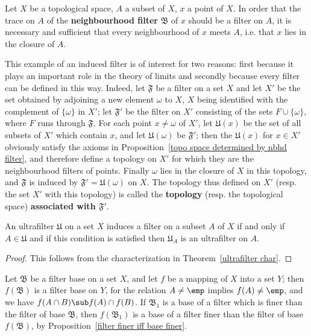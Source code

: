 \begin{example}
Let $X$ be a topological space, $A$ a subset of $X$, $x$ a point of $X$. In order that the trace on $A$ of the \textbf{neighbourhood filter} $\mathfrak{B}$ of $x$ should be a filter on $A$, it is necessary and sufficient that every neighbourhood of $x$ meets $A$, i.e. that $x$ lies in the closure of $A$.\par
This example of an induced filter is of interest for two reasons: first because it plays an important role in the theory of limits and secondly because every filter can be defined in this way. Indeed, let $\mathfrak{F}$ be a filter on a set $X$ and let $X'$ be the set obtained by adjoining a new element $\omega$ to $X$, $X$ being identified with the complement of $\{\omega\}$ in $X'$; let $\mathfrak{F}'$ be the filter on $X'$ consisting of the sets $F\cup\{\omega\}$, where $F$ runs through $\mathfrak{F}$. For each point $x\neq\omega$ of $X'$, let $\mathfrak{U}(x)$ be the set of all subsets of $X'$ which contain $x$, and let $\mathfrak{U}(\omega)$ be $\mathfrak{F}'$; then the $\mathfrak{U}(x)$ for $x\in X'$ obviously satisfy the axioms in Proposition~\ref{topo space determined by nbhd filter}, and therefore define a topology on $X'$ for which they are the neighbourhood filters of points. Finally $\omega$ lies in the closure of $X$ in this topology, and $\mathfrak{F}$ is induced by $\mathfrak{F}'=\mathfrak{U}(\omega)$ on $X$. The topology thus defined on $X'$ (resp. the set $X'$ with this topology) is called the \textbf{topology} (resp. the topological space) \textbf{associated with $\mathfrak{F}'$}.
\end{example}
\begin{proposition}
An ultrafilter $\mathfrak{U}$ on a set $X$ induces a filter on a subset $A$ of $X$ if and only if $A\in\mathfrak{U}$ and if this condition is satisfied then $\mathfrak{U}_A$ is an ultrafilter on $A$.
\end{proposition}
\begin{proof}
This follows from the characterization in Theorem~\ref{ultrafilter char}.
\end{proof}
Let $\mathfrak{B}$ be a filter base on a set $X$, and let $f$ be a mapping of $X$ into a set $Y$; then $f(\mathfrak{B})$ is a filter base on $Y$, for the relation $A\neq\emp$ implies $f(A)\neq\emp$, and we have $f(A\cap B)\sub f(A)\cap f(B)$. If $\mathfrak{B}_1$ is a base of a filter which is finer than the filter of base $\mathfrak{B}$, then $f(\mathfrak{B}_1)$ is a base of a filter finer than the filter of base $f(\mathfrak{B})$, by Proposition~\ref{filter finer iff base finer}.
